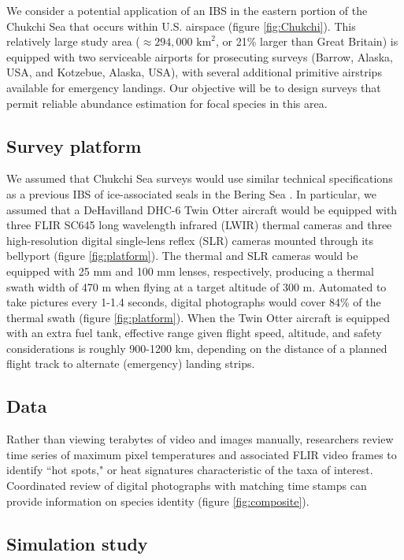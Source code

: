 \documentclass[]{rsos}%
\begin{document}
{We consider a potential application of an IBS in the eastern portion of the Chukchi Sea that occurs within U.S. airspace (figure \ref{fig:Chukchi}).  This relatively large study area ($\approx 294,000$ $\text{km}^2$, or 21\% larger than Great Britain) is equipped with two serviceable airports for prosecuting surveys (Barrow, Alaska, USA, and Kotzebue, Alaska, USA), with several additional primitive airstrips available for emergency landings.  Our objective will be to design surveys that permit reliable abundance estimation for focal species in this area.

\subsection{Survey platform}

We assumed that Chukchi Sea surveys would use similar technical specifications as a previous IBS of ice-associated seals in the Bering Sea \cite{ConnEtAl2014}.  In particular, we assumed that a DeHavilland DHC-6 Twin Otter aircraft would be equipped with three FLIR SC645 long wavelength infrared (LWIR) thermal cameras and three high-resolution digital single-lens reflex (SLR) cameras mounted through its bellyport (figure \ref{fig:platform}). The thermal and SLR cameras would be equipped with 25 mm and 100 mm lenses, respectively, producing a thermal swath width of 470 m when flying at a target altitude of 300 m. Automated to take pictures every 1-1.4 seconds, digital photographs would cover 84$\%$ of the thermal swath (figure \ref{fig:platform}).  When the Twin Otter aircraft is equipped with an extra fuel tank, effective range given flight speed, altitude, and safety considerations is roughly 900-1200 km, depending on the distance of a planned flight track to alternate (emergency) landing strips.

\subsection{Data}

Rather than viewing terabytes of video and images manually, researchers review time series of maximum pixel temperatures and associated FLIR video frames to identify ``hot spots," or heat signatures characteristic of the taxa of interest.  Coordinated review of digital photographs with matching time stamps can provide information on species identity (figure \ref{fig:composite}).

\subsection{Simulation study}

}
\end{document}
